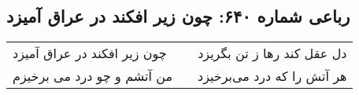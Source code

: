 \begin{center}
\section*{رباعی شماره ۶۴۰: چون زیر افکند در عراق آمیزد}
\label{sec:0640}
\begin{longtable}{l p{0.5cm} r}
چون زیر افکند در عراق آمیزد
&&
دل عقل کند رها ز تن بگریزد
\\
من آتشم و چو درد می برخیزم
&&
هر آتش را که درد می‌برخیزد
\\
\end{longtable}
\end{center}
